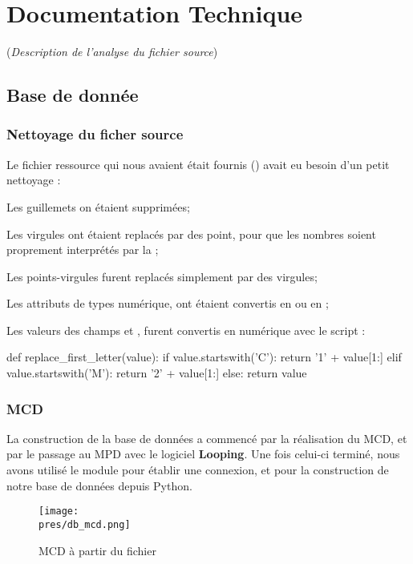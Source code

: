 \chapter{Documentation Technique}
    (\emph{Description de l'analyse du fichier source})    

    \section{Base de donnée}
        \subsection{Nettoyage du ficher source}
            Le fichier ressource qui nous avaient était fournis () avait eu besoin d'un petit nettoyage :
            \begin{bullet-enum}
                \item Les guillemets on étaient supprimées;
                \item Les virgules ont étaient replacés par des point, pour que les nombres soient proprement interprétés par la ;
                \item Les points-virgules furent replacés simplement par des virgules;
                \item Les attributs de types numérique, ont étaient convertis en  ou en ;
                \item Les valeurs des champs  et , furent convertis en numérique avec le script :
                \begin{pybox}
                    def replace_first_letter(value):
                        if value.startswith('C'):
                            return '1' + value[1:]
                        elif value.startswith('M'):
                            return '2' + value[1:]
                        else:
                            return value
                \end{pybox}
            \end{bullet-enum}

        \subsection{MCD}
            La construction de la base de données a commencé par la réalisation du MCD, et par le passage au MPD avec le logiciel \textbf{Looping}.
            Une fois celui-ci terminé, nous avons utilisé le module  pour établir une connexion, et pour la construction de notre base de données depuis Python.
            \begin{figure}[h]
                \centering
                \texttt{[image: \\pres/db\_mcd.png]}
                \caption{MCD à partir du fichier }
            \end{figure}

